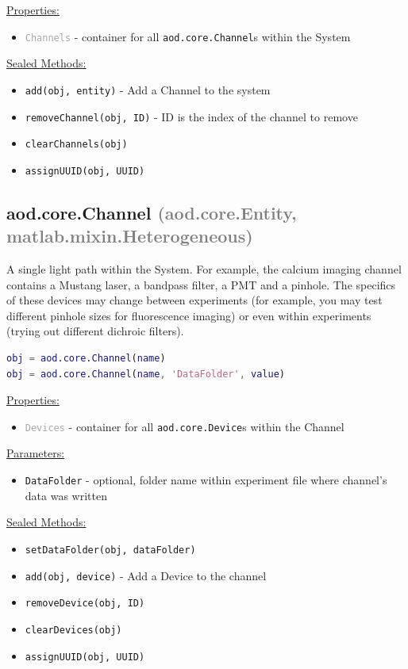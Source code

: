 \documentclass[10pt]{exam}
\newcommand\myparent[1]{\textcolor{gray}{(#1)}}
\newcommand\aodparam[1]{\textcolor{codepurple}{\texttt{#1}}}
\newcommand\aodclass[1]{\textcolor{codeblue}{\texttt{#1}}}
\newcommand\aodprop[1]{\textcolor{darkgray}{\texttt{#1}}}
\newcommand\aodfcn[1]{\textcolor{darkteal}{\texttt{#1}}}
\newcommand\docheader[1]{\vspace{0.6ex}\noindent\underline{#1}\vspace{0.15ex}}
\begin{document}
		\docheader{Properties:}
		\begin{itemize}
			\item \aodprop{Channels} - container for all \aodclass{aod.core.Channel}s within the System
		\end{itemize}
		\docheader{Sealed Methods:}
		\begin{itemize}
			\item \aodfcn{add(obj, entity)} - Add a Channel to the system
			\item \aodfcn{removeChannel(obj, ID)} - ID is the index of the channel to remove
			\item \aodfcn{clearChannels(obj)}
			\item \aodfcn{assignUUID(obj, UUID)}
		\end{itemize}
		
	\subsection{aod.core.Channel \myparent{aod.core.Entity, matlab.mixin.Heterogeneous}} 
		\label{subsection:ChannelDoc}
		\noindent A single light path within the System. For example, the calcium imaging channel contains a Mustang laser, a bandpass filter, a PMT and a pinhole. The specifics of these devices may change between experiments (for example, you may test different pinhole sizes for fluorescence imaging) or even within experiments (trying out different dichroic filters).
		
		\begin{lstlisting}[language=matlab]
obj = aod.core.Channel(name)
obj = aod.core.Channel(name, 'DataFolder', value)
		\end{lstlisting}
		
		\docheader{Properties:}
		\begin{itemize}
			\item \aodprop{Devices} - container for all \aodclass{aod.core.Device}s within the Channel
		\end{itemize}
		\docheader{Parameters:}
		\begin{itemize}
			\item \aodparam{DataFolder} - optional, folder name within experiment file where channel's data was written
		\end{itemize}
		\docheader{Sealed Methods:}
		\begin{itemize}
			\item \aodfcn{setDataFolder(obj, dataFolder)}
			\item \aodfcn{add(obj, device)} - Add a Device to the channel
			\item \aodfcn{removeDevice(obj, ID)}
			\item \aodfcn{clearDevices(obj)}
			\item \aodfcn{assignUUID(obj, UUID)}
		\end{itemize}
\end{document}
